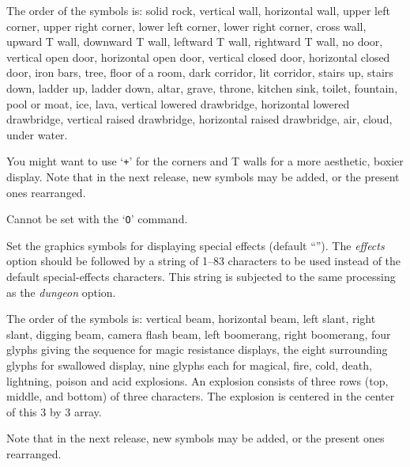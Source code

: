 The order of the symbols is:  solid rock, vertical wall, horizontal
wall, upper left corner, upper right corner, lower left corner, lower
right corner, cross wall, upward T wall, downward T wall, leftward T
wall, rightward T wall, no door, vertical open door, horizontal open
door, vertical closed door, horizontal closed door, iron bars, tree,
floor of a room, dark corridor, lit corridor, stairs up, stairs down,
ladder up, ladder down, altar, grave, throne, kitchen sink, toilet,
fountain, pool or moat,
ice, lava, vertical lowered drawbridge, horizontal lowered drawbridge,
vertical raised drawbridge, horizontal raised drawbridge, air, cloud,
under water.

You might want to use `{\tt +}' for the corners and T walls for a more
aesthetic, boxier display.  Note that in the next release, new symbols
may be added, or the present ones rearranged.

Cannot be set with the `{\tt O}' command.

\item[\ib{effects}]
Set the graphics symbols for displaying special effects
(default \relax{}``'').
The
{\it effects\/} 
option should be followed by a string of 1--83
characters to be used instead of the default special-effects characters.
This string is subjected to the same processing as the
{\it dungeon\/} 
option.

The order of the symbols is:  vertical beam, horizontal beam, left slant,
right slant, digging beam, camera flash beam, left boomerang, right boomerang,
four glyphs giving the sequence for magic resistance displays,
the eight surrounding glyphs for swallowed display,
nine glyphs each for magical, fire, cold, death, lightning, poison and acid explosions.
An explosion consists of three rows (top, middle, and bottom) of three
characters.  The explosion is centered in the center of this 3 by 3
array.

Note that in the next release, new symbols may be added,
or the present ones rearranged.

